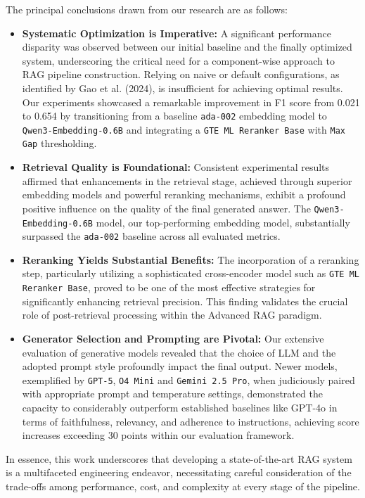The principal conclusions drawn from our research are as follows:
\begin{itemize}
    \item \textbf{Systematic Optimization is Imperative:} A significant performance disparity was observed between our initial baseline and the finally optimized system, underscoring the critical need for a component-wise approach to RAG pipeline construction. Relying on naive or default configurations, as identified by Gao et al. (2024), is insufficient for achieving optimal results. Our experiments showcased a remarkable improvement in F1 score from 0.021 to 0.654 by transitioning from a baseline \texttt{ada-002} embedding model to \texttt{Qwen3-Embedding-0.6B} and integrating a \texttt{GTE ML Reranker Base} with \texttt{Max Gap} thresholding.
    \item \textbf{Retrieval Quality is Foundational:} Consistent experimental results affirmed that enhancements in the retrieval stage, achieved through superior embedding models and powerful reranking mechanisms, exhibit a profound positive influence on the quality of the final generated answer. The \texttt{Qwen3-Embedding-0.6B} model, our top-performing embedding model, substantially surpassed the \texttt{ada-002} baseline across all evaluated metrics.
    \item \textbf{Reranking Yields Substantial Benefits:} The incorporation of a reranking step, particularly utilizing a sophisticated cross-encoder model such as \texttt{GTE ML Reranker Base}, proved to be one of the most effective strategies for significantly enhancing retrieval precision. This finding validates the crucial role of post-retrieval processing within the Advanced RAG paradigm.
    \item \textbf{Generator Selection and Prompting are Pivotal:} Our extensive evaluation of generative models revealed that the choice of LLM and the adopted prompt style profoundly impact the final output. Newer models, exemplified by \texttt{GPT-5}, \texttt{O4 Mini} and \texttt{Gemini 2.5 Pro}, when judiciously paired with appropriate prompt and temperature settings, demonstrated the capacity to considerably outperform established baselines like GPT-4o in terms of faithfulness, relevancy, and adherence to instructions, achieving score increases exceeding 30 points within our evaluation framework.
\end{itemize}

In essence, this work underscores that developing a state-of-the-art RAG system is a multifaceted engineering endeavor, necessitating careful consideration of the trade-offs among performance, cost, and complexity at every stage of the pipeline.

